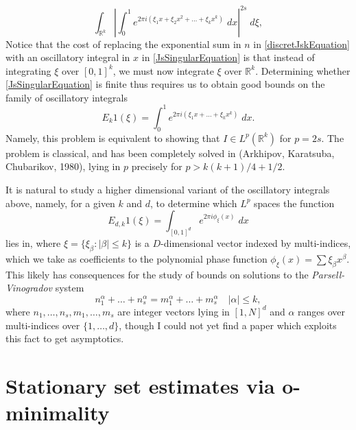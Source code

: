 \documentclass[12pt]{article}
\newcommand{\R}{\mathbb{R}}
\theoremstyle{definition}
\theoremstyle{remark}
\numberwithin{equation}{section}
\begin{document}
	\begin{equation} \label{JsSingularEquation}
		\int_{\R^k} \left| \int_0^1 e^{2 \pi i (\xi_1 x + \xi_2 x^2 + \dots + \xi_k x^k)}\; dx \right|^{2s}\; d\xi,
	\end{equation}
	Notice that the cost of replacing the exponential sum in $n$ in \eqref{discretJskEquation} with an oscillatory integral in $x$ in \eqref{JsSingularEquation} is that instead of integrating $\xi$ over $[0,1]^k$, we must now integrate $\xi$ over $\R^k$. Determining whether \eqref{JsSingularEquation} is finite thus requires us to obtain good bounds on the family of oscillatory integrals
	\begin{equation} \label{oscillatoryEquation}
		E_k 1(\xi) = \int_0^1 e^{2 \pi i (\xi_1 x + \dots + \xi_k x^k)}\; dx.
	\end{equation}
	Namely, this problem is equivalent to showing that $I \in L^p(\R^k)$ for $p = 2s$. The problem is classical, and has been completely solved in (Arkhipov, Karatsuba, Chubarikov, 1980), lying in $p$ precisely for $p > k(k+1)/4 + 1/2$.

    It is natural to study a higher dimensional variant of the oscillatory integrals above, namely, for a given $k$ and $d$, to determine which $L^p$ spaces the function
	\begin{equation} \label{higherdimensionaloscillatoryequation}
		E_{d,k} 1(\xi) = \int_{[0,1]^d} e^{2 \pi i \phi_\xi(x)}\; dx
	\end{equation}
	lies in, where $\xi = \{ \xi_\beta : |\beta| \leq k \}$ is a $D$-dimensional vector indexed by multi-indices, which we take as coefficients to the polynomial phase function $\phi_\xi(x) = \sum \xi_\beta x^\beta$. This likely has consequences for the study of bounds on solutions to the \emph{Parsell-Vinogradov} system
\[ n_1^\alpha + \dots + n_s^\alpha = m_1^\alpha + \dots + m_s^\alpha \quad\text{$|\alpha| \leq k$}, \]
%
where $n_1,\dots,n_s,m_1,\dots,m_s$ are integer vectors lying in $[1,N]^d$ and $\alpha$ ranges over multi-indices over $\{ 1, \dots, d \}$, though I could not yet find a paper which exploits this fact to get asymptotics.

\section{Stationary set estimates via o-minimality}\label{ominsection}
\end{document}
